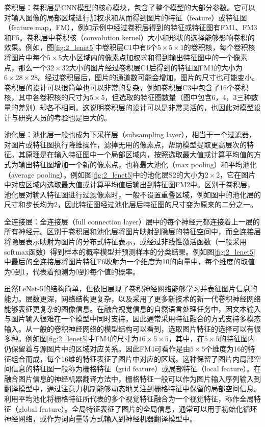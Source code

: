 {\sffamily 卷积层：}卷积层是CNN模型的核心模块，包含了整个模型的大部分参数。它可以对输入图像的局部区域进行加权求和从而得到图片的特征（feature）或特征图（feature map，FM），例如示例中经过卷积层得到的特征或特征图有FM1、FM3和F5。卷积层中卷积核（convolution kernel）大小和形状的选择能够影响卷积的效果。例如，图\ref{fig:2_lenet5}中卷积层C1中有6个$5 \times 5 \times 1$的卷积核，每个卷积核将图片中每个$5 \times 5$大小区域内的像素点加权求和得到输出特征图中的一个像素点，那么一个$32 \times 32$大小的图片经过卷积层C1后得到的特征图FM1的大小为$6 \times 28 \times 28$。经过卷积层后，图片的通道数可能会增加，图片的尺寸也可能变小。卷积层的设计可以很简单也可以非常的复杂，例如卷积层C3中包含了16个卷积核，其中各卷积核的尺寸为$5 \times 5$，但选取的特征图数量（图中包含6，4，3三种数量的差别）却各不相同。这说明卷积层的设计可以是非常灵活的，也因此对模型设计与研究人员的考验也是巨大的。

{\sffamily 池化层：}池化层一般也成为下采样层（subsampling layer），相当于一个过滤器，对图片或特征图执行降维操作，滤掉无用的像素点，帮助模型提取更高层次的特征。其原理是在输入特征图中一个局部区域内，按照选取最大值或计算平均值的方式为输出特征图增加一个新的像素点，也称最大池化（max pooling）和平均池化（average pooling）。例如图\ref{fig:2_lenet5}中的池化层S2的大小为$2 \times 2$，它在图片中对应区域内选取最大值或计算平均值后输出到特征图FM2中。区别于卷积层，池化层对输入特征图进行过滤像素时，一般不设置重叠区域，例如图中的池化层的尺寸和步长均为2，因此特征图经过池化层后特征图的尺寸变为原来的二分之一。

{\sffamily 全连接层：}全连接层（full connection layer）层中的每个神经元都连接着上一层的所有神经元。区别于卷积层和池化层将图片映射到隐层的特征空间中，而全连接层将隐层表示映射为图片的分布式特征表示，或经过非线性激活函数（一般采用softmax函数）得到样本的概率模型并预测样本的分类结果。例如图\ref{fig:2_lenet5}中最后的全连接层将图片特征F6映射为一个维度为10的向量中，每个维度的取值为0到1，代表着预测为0到9每个值的概率。

虽然LeNet-5的结构简单，但依旧展现了卷积神经网络能够学习并表征图片信息的能力。层数更深，网络结构更复杂，以及采用了更多新技术的新一代卷积神经网络能够表征更复杂的图像信息。在融合视觉信息的自然语言处理任务中，因文本输入与图片输入很难在一个模型中同时支持，因此通常采用特征融合的方式支持多模态输入。从一般的卷积神经网络的模型结构可以看到，选取图片特征的选择可以有很多种。例如图\ref{fig:2_lenet5}中FM4的尺寸为$16 \times 5 \times 5$，其中，在$5 \times 5$的特征图内仍保留着与源图片中的区域对应关系。因此FM4可看作是由$5 \times 5$个维度为16的特征组合而成，每个16维的特征表征了图片中对应的区域。这种保留了图片内局部空间信息的特征图一般称为栅格特征（grid feature）或局部特征（local feature）。在融合图片信息的神经机器翻译方法中，栅格特征一般可以作为图片输入序列输入到翻译模型中，通过注意力机制能够动态地关注到栅格特征中保留的局部空间信息。利用平均池化将栅格特征所代表的多个视觉特征融合为一个视觉特征，称作全局特征（global feature）。全局特征表征了图片的全局信息，通常可以用于初始化循环神经网络，或作为词向量等方式输入到神经机器翻译模型中。

